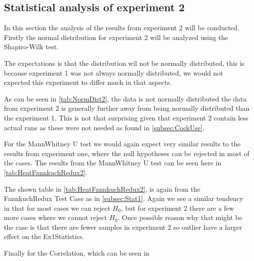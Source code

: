 \subsection{Statistical analysis of experiment 2}
In this section the analysis of the results from experiment 2 will be conducted. Firstly the normal distribution for experiment 2 will be analyzed using the Shapiro-Wilk test. 

The expectations is that the distribution wil not be normally distributed, this is because experiment 1 was not always normally distributed, we would not expected this experiment to differ much in that aspects. 

 

As can be seen in \cref{tab:NormDist2}, the data is not normally distributed the data from experiment 2 is generally further away from being normally distributed than the experiment 1. This is not that surprising given that experiment 2 contain less actual runs as these were not needed as found in \cref{subsec:CockUse}. 

For the MannWhitney U test we would again expect very similar results to the results from experiment one, where the null hypotheses can be rejected in most of the cases.
The results from the MannWhitney U test can be seen here in \cref{tab:HeatFannkuchRedux2}.

The shown table in \cref{tab:HeatFannkuchRedux2}, is again from the FannkuchRedux Test Case as in \cref{subsec:Stat1}. Again we see a similar tendency in that for most cases we can reject $H_0$, but for experiment 2 there are a few more cases where we cannot reject $H_0$. Once possible reason why that might be the case is that there are fewer samples in experiment 2 so outlier have a larger effect on the Ex1Statistics.

Finally for the Correlation, which can be seen in 



